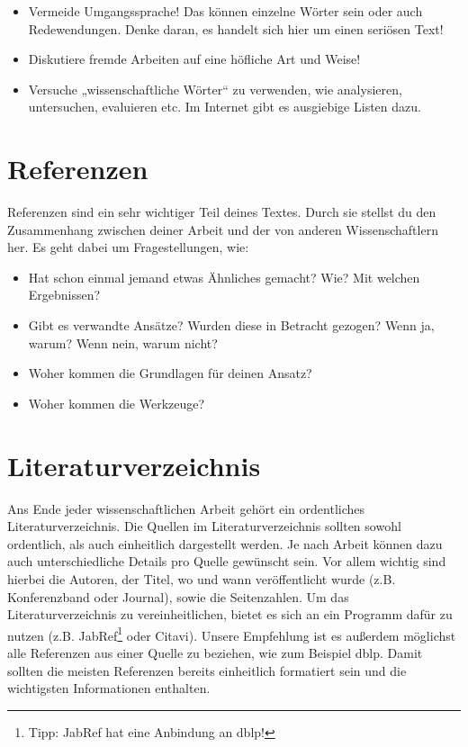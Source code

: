 \begin{itemize}
	\item Vermeide Umgangssprache! Das können einzelne Wörter sein oder auch Redewendungen. Denke daran, es handelt sich hier um einen seriösen Text!
	
	\item Diskutiere fremde Arbeiten auf eine höfliche Art und Weise!
	
	\item Versuche „wissenschaftliche Wörter“ zu verwenden, wie analysieren, untersuchen, evaluieren etc. Im Internet gibt es ausgiebige Listen dazu.
\end{itemize}

\section{Referenzen}
Referenzen sind ein sehr wichtiger Teil deines Textes. Durch sie stellst du den Zusammenhang zwischen deiner Arbeit und der von anderen Wissenschaftlern her. 
Es geht dabei um Fragestellungen, wie: 
\begin{itemize}
	\item Hat schon einmal jemand etwas Ähnliches gemacht? Wie? Mit welchen Ergebnissen?
	
	\item Gibt es verwandte Ansätze? Wurden diese in Betracht gezogen? Wenn ja, warum? Wenn nein, warum nicht?
	
	\item Woher kommen die Grundlagen für deinen Ansatz?
	
	\item Woher kommen die Werkzeuge?
\end{itemize}

\section{Literaturverzeichnis}
Ans Ende jeder wissenschaftlichen Arbeit gehört ein ordentliches Literaturverzeichnis.
Die Quellen im Literaturverzeichnis sollten sowohl ordentlich, als auch einheitlich dargestellt werden. 
Je nach Arbeit können dazu auch unterschiedliche Details pro Quelle gewünscht sein.
Vor allem wichtig sind hierbei die Autoren, der Titel, wo und wann veröffentlicht wurde (z.B. Konferenzband oder Journal), sowie die Seitenzahlen.
Um das Literaturverzeichnis zu vereinheitlichen, bietet es sich an ein Programm dafür zu nutzen (z.B. JabRef\footnote{Tipp: JabRef hat eine Anbindung an dblp!} oder Citavi).
Unsere Empfehlung ist es außerdem möglichst alle Referenzen aus einer Quelle zu beziehen, wie zum Beispiel dblp. 
Damit sollten die meisten Referenzen bereits einheitlich formatiert sein und die wichtigsten Informationen enthalten.

